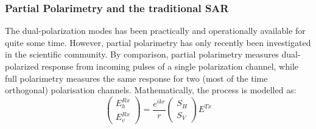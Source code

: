 %

\subsubsection{ Partial Polarimetry and the traditional SAR}

The dual-polarization modes has been practically and operationally available for quite some time.
However, partial polarimetry has only recently been investigated in the scientific community. 
By comparison, 
	partial polarimetry measures dual-polarized response from incoming pulses of a single polarization channel,
	while full polarimetry measures the same response for two (most of the time orthogonal) polarisation channels.
Mathematically, the process is modelled as:
\begin{equation}
 \left( 
\begin{array}{c}
 E_h^{Rx} \\
 E_v^{Rx}
\end{array}
 \right) = \frac{e^{ikr}}{r} 
\left( 
\begin{array}{c}
 S_{H} \\
 S_{V}
\end{array}
 \right) E^{Tx}
\end{equation}

